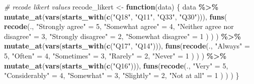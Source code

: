 \documentclass[12pt,twoside]{reedthesis}
\newenvironment{Shaded}{\begin{snugshade}}{\end{snugshade}}
\newcommand{\CommentTok}[1]{\textcolor[rgb]{0.56,0.35,0.01}{\textit{#1}}}
\newcommand{\ControlFlowTok}[1]{\textcolor[rgb]{0.13,0.29,0.53}{\textbf{#1}}}
\newcommand{\DecValTok}[1]{\textcolor[rgb]{0.00,0.00,0.81}{#1}}
\newcommand{\KeywordTok}[1]{\textcolor[rgb]{0.13,0.29,0.53}{\textbf{#1}}}
\newcommand{\NormalTok}[1]{#1}
\newcommand{\OperatorTok}[1]{\textcolor[rgb]{0.81,0.36,0.00}{\textbf{#1}}}
\newcommand{\StringTok}[1]{\textcolor[rgb]{0.31,0.60,0.02}{#1}}
\begin{document}
\begin{Shaded}
\begin{Highlighting}[]
\CommentTok{\# recode likert values}
\NormalTok{recode\_likert \textless{}{-}}\StringTok{ }\ControlFlowTok{function}\NormalTok{(data) \{}
\NormalTok{  data }\OperatorTok{\%\textgreater{}\%}
\StringTok{    }\KeywordTok{mutate\_at}\NormalTok{(}\KeywordTok{vars}\NormalTok{(}\KeywordTok{starts\_with}\NormalTok{(}\KeywordTok{c}\NormalTok{(}\StringTok{"Q18"}\NormalTok{, }\StringTok{"Q11"}\NormalTok{, }\StringTok{"Q33"}\NormalTok{, }\StringTok{"Q30"}\NormalTok{))), }
              \KeywordTok{funs}\NormalTok{(}
                \KeywordTok{recode}\NormalTok{(.,}
                                 \StringTok{"Strongly agree"}\NormalTok{ =}\StringTok{ }\DecValTok{5}\NormalTok{,}
                                 \StringTok{"Somewhat agree"}\NormalTok{ =}\StringTok{ }\DecValTok{4}\NormalTok{,}
                                 \StringTok{"Neither agree nor disagree"}\NormalTok{ =}\StringTok{ }\DecValTok{3}\NormalTok{,}
                                 \StringTok{"Strongly disagree"}\NormalTok{ =}\StringTok{ }\DecValTok{2}\NormalTok{,}
                                 \StringTok{"Somewhat disagree"}\NormalTok{ =}\StringTok{ }\DecValTok{1}
\NormalTok{                       )}
\NormalTok{                  )}
\NormalTok{              ) }\OperatorTok{\%\textgreater{}\%}
\StringTok{    }\KeywordTok{mutate\_at}\NormalTok{(}\KeywordTok{vars}\NormalTok{(}\KeywordTok{starts\_with}\NormalTok{(}\KeywordTok{c}\NormalTok{(}\StringTok{"Q17"}\NormalTok{, }\StringTok{"Q14"}\NormalTok{))), }
              \KeywordTok{funs}\NormalTok{(}\KeywordTok{recode}\NormalTok{(.,}
                                 \StringTok{"Always"}\NormalTok{ =}\StringTok{ }\DecValTok{5}\NormalTok{,}
                                 \StringTok{"Often"}\NormalTok{ =}\StringTok{ }\DecValTok{4}\NormalTok{,}
                                 \StringTok{"Sometimes"}\NormalTok{ =}\StringTok{ }\DecValTok{3}\NormalTok{,}
                                 \StringTok{"Rarely"}\NormalTok{ =}\StringTok{ }\DecValTok{2}\NormalTok{,}
                                 \StringTok{"Never"}\NormalTok{ =}\StringTok{ }\DecValTok{1}
\NormalTok{                          )}
\NormalTok{                   )}
\NormalTok{              ) }\OperatorTok{\%\textgreater{}\%}
\StringTok{    }\KeywordTok{mutate\_at}\NormalTok{(}\KeywordTok{vars}\NormalTok{(}\KeywordTok{starts\_with}\NormalTok{(}\KeywordTok{c}\NormalTok{(}\StringTok{"Q16"}\NormalTok{))), }
              \KeywordTok{funs}\NormalTok{(}\KeywordTok{recode}\NormalTok{(.,}
                          \StringTok{"Very"}\NormalTok{ =}\StringTok{ }\DecValTok{5}\NormalTok{,}
                          \StringTok{"Considerably"}\NormalTok{ =}\StringTok{ }\DecValTok{4}\NormalTok{,}
                          \StringTok{"Somewhat"}\NormalTok{ =}\StringTok{ }\DecValTok{3}\NormalTok{,}
                          \StringTok{"Slightly"}\NormalTok{ =}\StringTok{ }\DecValTok{2}\NormalTok{,}
                          \StringTok{"Not at all"}\NormalTok{ =}\StringTok{ }\DecValTok{1}
\NormalTok{              )}
\NormalTok{              )}
\NormalTok{    )}
\NormalTok{\}}


\end{Highlighting}
\end{Shaded}
\end{document}
